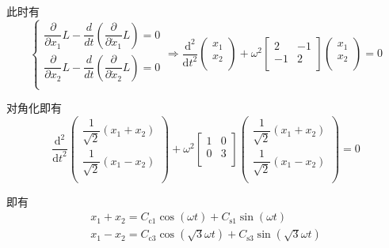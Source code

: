 \documentclass[UTF8]{ctexart}
\newcommand{\rmd}{\mathrm{d}}
\begin{document}
		此时有
		\begin{equation}
			\begin{cases}
				\dfrac{\partial}{\partial x_1}L - \dfrac{d}{dt}\left(\dfrac{\partial}{\partial \dot{x}_{1}}L\right) = 0 \\
				\dfrac{\partial}{\partial x_2}L - \dfrac{d}{dt}\left(\dfrac{\partial}{\partial \dot{x}_{2}}L\right) = 0 \\
			\end{cases}
			\Longrightarrow
			\dfrac{\rmd^{2}}{{\rmd t}^{2}}
			\left(
				\begin{matrix}
					x_{1} \\
					x_{2} \\
				\end{matrix}
			\right)
			+
			\omega^2
			\left[
				\begin{matrix}
					2 & -1 \\
					-1 & 2 \\
				\end{matrix}
			\right]
			\left(
				\begin{matrix}
					x_{1} \\
					x_{2} \\
				\end{matrix}
			\right)
			= 0
			\label{eq:2-balls-3-strings-Lx2}
		\end{equation}

		对角化即有
		\begin{equation}
			\dfrac{\rmd^{2}}{{\rmd t}^{2}}
			\left(
				\begin{matrix}
					\dfrac{1}{\sqrt{2}} \left(x_{1} + x_{2}\right) \\
					\dfrac{1}{\sqrt{2}} \left(x_{1} - x_{2}\right) \\
				\end{matrix}
			\right)
			+
			\omega^2
			\left[
				\begin{matrix}
					1 & 0 \\
					0 & 3 \\
				\end{matrix}
			\right]
			\left(
				\begin{matrix}
					\dfrac{1}{\sqrt{2}} \left(x_{1} + x_{2}\right) \\
					\dfrac{1}{\sqrt{2}} \left(x_{1} - x_{2}\right) \\
				\end{matrix}
			\right)
			= 0
		\end{equation}

		即有
		\begin{gather}
			x_{1} + x_{2} = C_{\mathrm{c1}} \cos (         \omega t) + C_{\mathrm{s1}} \sin (         \omega t) \\
			x_{1} - x_{2} = C_{\mathrm{c3}} \cos (\sqrt{3} \omega t) + C_{\mathrm{s3}} \sin (\sqrt{3} \omega t)
		\end{gather}
\end{document}

